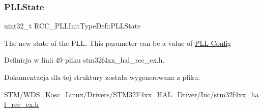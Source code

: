 \subsubsection{\texorpdfstring{P\+L\+L\+State}{PLLState}}
{\footnotesize\ttfamily uint32\+\_\+t R\+C\+C\+\_\+\+P\+L\+L\+Init\+Type\+Def\+::\+P\+L\+L\+State}

The new state of the P\+LL. This parameter can be a value of \hyperlink{group___r_c_c___p_l_l___config}{P\+LL Config} 

Definicja w linii 49 pliku stm32f4xx\+\_\+hal\+\_\+rcc\+\_\+ex.\+h.



Dokumentacja dla tej struktury została wygenerowana z pliku\+:\begin{DoxyCompactItemize}
\item 
S\+T\+M/\+W\+D\+S\+\_\+\+Kosc\+\_\+\+Linux/\+Drivers/\+S\+T\+M32\+F4xx\+\_\+\+H\+A\+L\+\_\+\+Driver/\+Inc/\hyperlink{stm32f4xx__hal__rcc__ex_8h}{stm32f4xx\+\_\+hal\+\_\+rcc\+\_\+ex.\+h}\end{DoxyCompactItemize}
